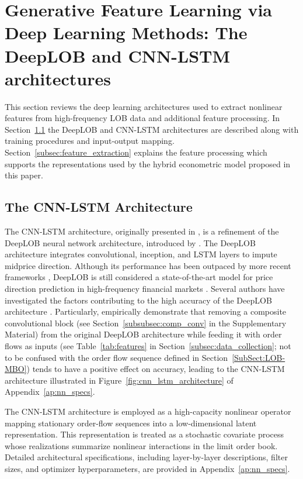 \documentclass{rQUF2e}
\theoremstyle{plain}
\theoremstyle{definition}
\theoremstyle{remark}
\begin{document}
\section{Generative Feature Learning via Deep Learning Methods: The DeepLOB and CNN-LSTM architectures}
\label{Sect:Features}
This section reviews the deep learning architectures used to extract nonlinear features from high-frequency LOB data and additional feature processing. In Section~\ref{subsec:cnn_lstm} the DeepLOB \citep{zhang2021deeplearningmarketorder} and CNN-LSTM architectures \citep{kolm2023deep} are described along with training procedures and input-output mapping. Section~\ref{subsec:feature_extraction} explains the feature processing which supports the representations used by the hybrid econometric model proposed in this paper.
\subsection{The CNN-LSTM Architecture}
\label{subsec:cnn_lstm}
The CNN-LSTM architecture, originally presented in \citet{kolm2023deep}, is a refinement of the DeepLOB neural network architecture, introduced by \citet{Zhang_2019}. The DeepLOB architecture integrates convolutional, inception, and LSTM layers to impute midprice direction. Although its performance has been outpaced by more recent frameworks \citep{prata2024lob}, DeepLOB is still considered a state-of-the-art model for price direction prediction in high-frequency financial markets \citep{briola2024deep, kolm2023deep}. Several authors have investigated the factors contributing to the high accuracy of the DeepLOB architecture \citep{kolm2023deep, kolm2024improving, briola2024deep}. Particularly, \citet{kolm2023deep} empirically demonstrate that removing a composite convolutional block (see Section~\ref{subsubsec:comp_conv} in the Supplementary Material) from the original DeepLOB architecture while feeding it with order flows as inputs (see Table~\ref{tab:features} in Section~\ref{subsec:data_collection}; not to be confused with the order flow sequence defined in Section~\ref{SubSect:LOB-MBO}) tends to have a positive effect on accuracy, leading to the CNN-LSTM architecture illustrated in Figure~\ref{fig:cnn_lstm_architecture} of Appendix~\ref{ap:nn_specs}.

The CNN-LSTM architecture is employed as a high-capacity nonlinear operator mapping stationary order-flow sequences into a low-dimensional latent representation. This representation is treated as a stochastic covariate process whose realizations summarize nonlinear interactions in the limit order book. Detailed architectural specifications, including layer-by-layer descriptions, filter sizes, and optimizer hyperparameters, are provided in Appendix~\ref{ap:nn_specs}.
\end{document}
